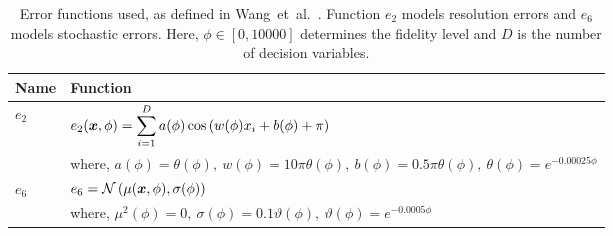 \begin{table}[h!]
\centering
\caption{\small{}Error functions used, as defined in Wang~et~al.~\cite{wang2017generic}. Function $e_2$ models resolution errors and $e_6$ models stochastic errors. Here, $\phi \in [0,10000]$ determines the fidelity level and $D$ is the number of decision variables.}\label{tab:errfuncs}
\begin{adjustbox}{width=0.6\textwidth}
{%
\begin{tabular}{ll} \toprule
Name & Function \\ \midrule
%
$e_2$         & $e_2(\boldsymbol{x},\phi) = \displaystyle\sum_{i=1}^{D}a(\phi)\cos{\left(w(\phi)x_i+b(\phi)+\pi\right)}$\\[0.3cm]
              & where, $a(\phi) = \theta(\phi),\ w(\phi) = 10\pi\theta(\phi),\ b(\phi) = 0.5\pi\theta(\phi),\ \theta(\phi) = e^{-0.00025\phi}$\\
\midrule
$e_6$         & $e_6 = \mathcal{N}\left(\mu(\boldsymbol{x},\phi),\sigma(\phi)\right)$ \\[0.3cm]
              & where, $\mu^2(\phi) = 0,\ \sigma(\phi) = 0.1\vartheta(\phi),\ \vartheta(\phi) = e^{-0.0005\phi}$\\
\bottomrule
\end{tabular}
}
\end{adjustbox}
\end{table}
